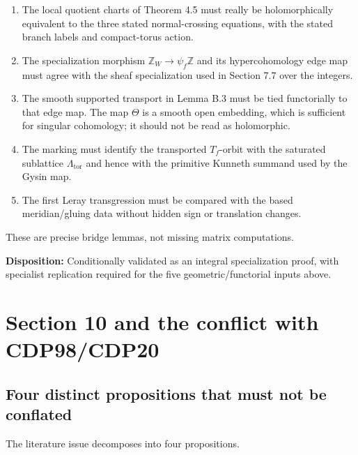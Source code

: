 \documentclass[
  10pt,
  letterpaper,
]{article}
\providecommand{\tightlist}{%
  \setlength{\itemsep}{0pt}\setlength{\parskip}{0pt}}
\begin{document}
\begin{enumerate}
\def\labelenumi{\arabic{enumi}.}
\tightlist
\item
  The local quotient charts of Theorem 4.5 must really be
  holomorphically equivalent to the three stated normal-crossing
  equations, with the stated branch labels and compact-torus action.
\item
  The specialization morphism \(\mathbb Z_W\to\psi_f\mathbb Z\) and its
  hypercohomology edge map must agree with the sheaf specialization used
  in Section 7.7 over the integers.
\item
  The smooth supported transport in Lemma B.3 must be tied functorially
  to that edge map. The map \(\Theta\) is a smooth open embedding, which
  is sufficient for singular cohomology; it should not be read as
  holomorphic.
\item
  The marking must identify the transported \(T_f\)-orbit with the
  saturated sublattice \(\Lambda_{\mathrm{tor}}\) and hence with the
  primitive Kunneth summand used by the Gysin map.
\item
  The first Leray transgression must be compared with the based
  meridian/gluing data without hidden sign or translation changes.
\end{enumerate}

These are precise bridge lemmas, not missing matrix computations.

\textbf{Disposition:} Conditionally validated as an integral
specialization proof, with specialist replication required for the five
geometric/functorial inputs above.

\section{Section 10 and the conflict with
CDP98/CDP20}\label{section-10-and-the-conflict-with-cdp98cdp20}

\subsection{Four distinct propositions that must not be
conflated}\label{four-distinct-propositions-that-must-not-be-conflated}

The literature issue decomposes into four propositions.
\end{document}
